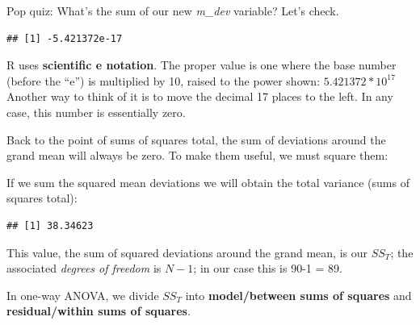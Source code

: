 \documentclass[
  english,
]{book}
\newenvironment{Shaded}{\begin{snugshade}}{\end{snugshade}}
\newcommand{\DataTypeTok}[1]{\textcolor[rgb]{0.13,0.29,0.53}{#1}}
\newcommand{\DecValTok}[1]{\textcolor[rgb]{0.00,0.00,0.81}{#1}}
\newcommand{\KeywordTok}[1]{\textcolor[rgb]{0.13,0.29,0.53}{\textbf{#1}}}
\newcommand{\NormalTok}[1]{#1}
\newcommand{\OperatorTok}[1]{\textcolor[rgb]{0.81,0.36,0.00}{\textbf{#1}}}
\newcommand{\StringTok}[1]{\textcolor[rgb]{0.31,0.60,0.02}{#1}}
\begin{document}
Pop quiz: What's the sum of our new \emph{m\_dev} variable? Let's check.

\begin{Shaded}
\end{Shaded}

\begin{verbatim}
## [1] -5.421372e-17
\end{verbatim}

R uses \textbf{scientific e notation}. The proper value is one where the base number (before the ``e'') is multiplied by 10, raised to the power shown: \(5.421372 * 10^{17}\) Another way to think of it is to move the decimal 17 places to the left. In any case, this number is essentially zero.

Back to the point of sums of squares total, the sum of deviations around the grand mean will always be zero. To make them useful, we must square them:

\begin{Shaded}
\end{Shaded}

If we sum the squared mean deviations we will obtain the total variance (sums of squares total):

\begin{Shaded}
\end{Shaded}

\begin{verbatim}
## [1] 38.34623
\end{verbatim}

This value, the sum of squared deviations around the grand mean, is our \(SS_T\); the associated \emph{degrees of freedom} is \(N - 1\); in our case this is 90-1 = 89.

In one-way ANOVA, we divide \(SS_T\) into \textbf{model/between sums of squares} and \textbf{residual/within sums of squares}.
\end{document}
